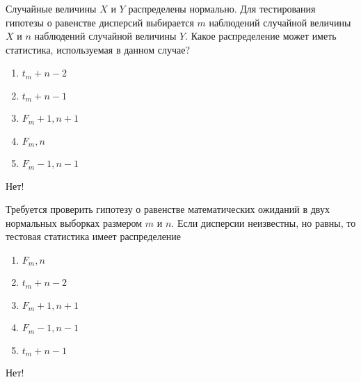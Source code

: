 \documentclass[t]{beamer}
\begin{document}
 \begin{frame} \label{1-No} 
\begin{block}{1} 

  Случайные величины $X$ и $Y$ распределены нормально. Для тестирования гипотезы о равенстве дисперсий выбирается $m$ наблюдений случайной величины $X$ и $n$ наблюдений случайной величины $Y$. Какое распределение может иметь статистика, используемая в данном случае?
  


 \end{block} 
\begin{enumerate} 
\item[] \hyperlink{1-No}{\beamergotobutton{} $t_m+n-2$}
\item[] \hyperlink{1-No}{\beamergotobutton{} $t_m+n-1$}
\item[] \hyperlink{1-No}{\beamergotobutton{} $F_m+1,n+1$}
\item[] \hyperlink{1-No}{\beamergotobutton{} $F_m,n$}
\item[] \hyperlink{1-Yes}{\beamergotobutton{} $F_m-1,n-1$}
\end{enumerate} 

 \alert{Нет!} 
\end{frame} 


 \begin{frame} \label{2-No} 
\begin{block}{2} 

  Требуется проверить гипотезу о равенстве математических ожиданий в двух нормальных выборках размером $m$ и $n$. Если дисперсии неизвестны, но равны, то тестовая статистика имеет распределение
  


 \end{block} 
\begin{enumerate} 
\item[] \hyperlink{2-No}{\beamergotobutton{} $F_m,n$}
\item[] \hyperlink{2-Yes}{\beamergotobutton{} $t_m+n-2$}
\item[] \hyperlink{2-No}{\beamergotobutton{} $F_m+1,n+1$}
\item[] \hyperlink{2-No}{\beamergotobutton{} $F_m-1,n-1$}
\item[] \hyperlink{2-No}{\beamergotobutton{} $t_m+n-1$}
\end{enumerate} 

 \alert{Нет!} 
\end{frame} 
\end{document}
